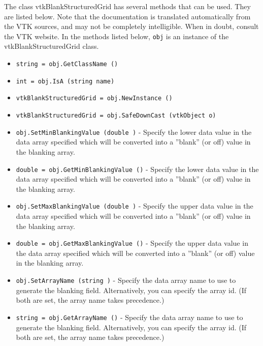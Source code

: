 The class vtkBlankStructuredGrid has several methods that can be used.
  They are listed below.
Note that the documentation is translated automatically from the VTK sources,
and may not be completely intelligible.  When in doubt, consult the VTK website.
In the methods listed below, \verb|obj| is an instance of the vtkBlankStructuredGrid class.
\begin{itemize}
\item  \verb|string = obj.GetClassName ()|

\item  \verb|int = obj.IsA (string name)|

\item  \verb|vtkBlankStructuredGrid = obj.NewInstance ()|

\item  \verb|vtkBlankStructuredGrid = obj.SafeDownCast (vtkObject o)|

\item  \verb|obj.SetMinBlankingValue (double )| -  Specify the lower data value in the data array specified which will be
 converted into a ''blank'' (or off) value in the blanking array.

\item  \verb|double = obj.GetMinBlankingValue ()| -  Specify the lower data value in the data array specified which will be
 converted into a ''blank'' (or off) value in the blanking array.

\item  \verb|obj.SetMaxBlankingValue (double )| -  Specify the upper data value in the data array specified which will be
 converted into a ''blank'' (or off) value in the blanking array.

\item  \verb|double = obj.GetMaxBlankingValue ()| -  Specify the upper data value in the data array specified which will be
 converted into a ''blank'' (or off) value in the blanking array.

\item  \verb|obj.SetArrayName (string )| -  Specify the data array name to use to generate the blanking
 field. Alternatively, you can specify the array id. (If both are set,
 the array name takes precedence.)

\item  \verb|string = obj.GetArrayName ()| -  Specify the data array name to use to generate the blanking
 field. Alternatively, you can specify the array id. (If both are set,
 the array name takes precedence.)


\end{itemize}
